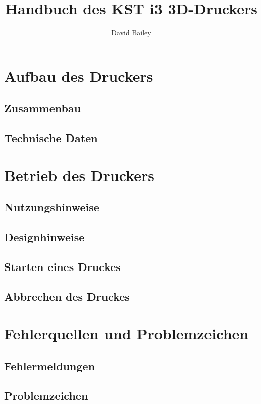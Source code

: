 \documentclass[11pt,a4paper]{article}
\title{Handbuch des KST i3 3D-Druckers}
\author{David Bailey}
\begin{document}
\maketitle
\newpage

\tableofcontents

\newpage
\section{Aufbau des Druckers}
\subsection{Zusammenbau}

\subsection{Technische Daten}


\newpage
\section{Betrieb des Druckers}
\subsection{Nutzungshinweise}

\subsection{Designhinweise}

\subsection{Starten eines Druckes}
\subsection{Abbrechen des Druckes}

\newpage
\section{Fehlerquellen und Problemzeichen}
\subsection{Fehlermeldungen}

\subsection{Problemzeichen}

\end{document}
